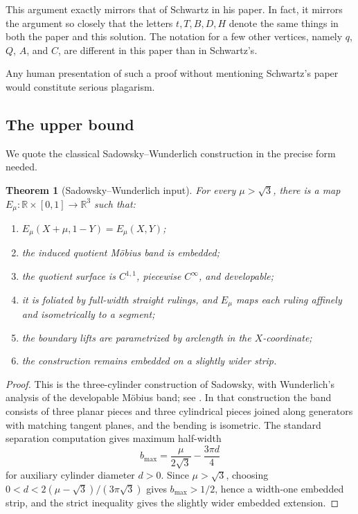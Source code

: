 \documentclass[12pt]{article}
\newcommand{\R}{\mathbb R}
\theoremstyle{plain}
\newtheorem{theorem}{Theorem}
\newcommand{\review}[1]{\begin{reviewbox}#1\end{reviewbox}}
\begin{document}
\review{This argument exactly mirrors that of Schwartz in his paper. In fact, it mirrors the argument so closely that the letters $t, T, B, D, H$ denote the same things in both the paper and this solution. The notation for a few other vertices, namely $q$, $Q$, $A$, and $C$, are different in this paper than in Schwartz's. 

Any human presentation of such a proof without mentioning Schwartz's paper would constitute serious plagarism.}

\subsection{The upper bound}

We quote the classical Sadowsky--Wunderlich construction in the precise form
needed.

\begin{theorem}[Sadowsky--Wunderlich input]\label{thm:sadowsky}
For every \(\mu>\sqrt3\), there is a map
\(E_\mu:\R\times[0,1]\to\R^3\) such that:
\begin{enumerate}
\item \(E_\mu(X+\mu,1-Y)=E_\mu(X,Y)\);
\item the induced quotient M\"obius band is embedded;
\item the quotient surface is \(C^{1,1}\), piecewise \(C^\infty\), and
developable;
\item it is foliated by full-width straight rulings, and \(E_\mu\) maps each
ruling affinely and isometrically to a segment;
\item the boundary lifts are parametrized by arclength in the \(X\)-coordinate;
\item the construction remains embedded on a slightly wider strip.
\end{enumerate}
\end{theorem}

\begin{proof}
This is the three-cylinder construction of Sadowsky, with Wunderlich's
analysis of the developable M\"obius band; see \cite{Sad30,Wun62}.  In that
construction the band consists of three planar pieces and three cylindrical
pieces joined along generators with matching tangent planes, and the bending is
isometric.  The standard separation computation gives maximum half-width
\[
b_{\max}=\frac{\mu}{2\sqrt3}-\frac{3\pi d}{4}
\]
for auxiliary cylinder diameter \(d>0\).  Since \(\mu>\sqrt3\), choosing
\(0<d<2(\mu-\sqrt3)/(3\pi\sqrt3)\) gives \(b_{\max}>1/2\), hence a width-one
embedded strip, and the strict inequality gives the slightly wider embedded
extension.
\end{proof}
\end{document}
